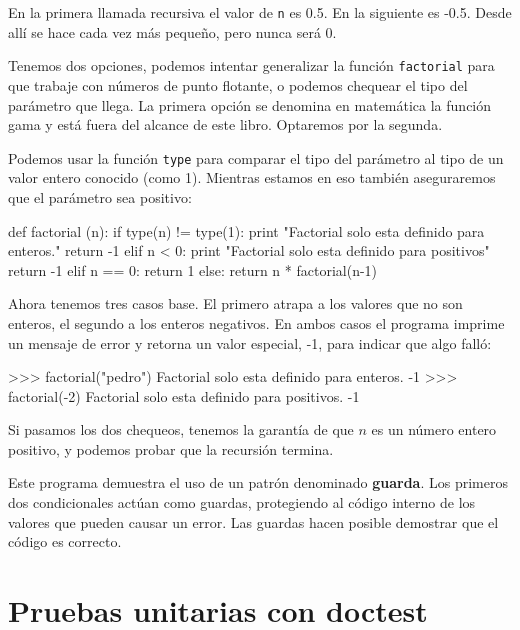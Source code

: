 
En la primera llamada recursiva el valor de  \texttt{n} es 0.5.
En la siguiente es -0.5.  Desde allí se hace cada vez más 
pequeño, pero nunca será 0.

Tenemos dos opciones, podemos intentar generalizar la función
 \texttt{factorial} para que trabaje con números de punto flotante, o
podemos chequear el tipo del parámetro que llega. La primera opción
se denomina en matemática la función gama y está fuera del 
alcance de este libro. Optaremos por la segunda.


Podemos usar la función  \texttt{type} para comparar el tipo
del parámetro al tipo de un valor entero conocido (como 1).  
Mientras estamos en eso también aseguraremos que el parámetro
sea positivo:

\beforeverb
\begin{pythoncode}
def factorial (n):
  if type(n) != type(1):
    print "Factorial solo esta definido para enteros."
    return -1
  elif n < 0:
    print "Factorial solo esta definido para positivos"
    return -1
  elif n == 0:
    return 1
  else:
    return n * factorial(n-1)
\end{pythoncode}
\afterverb
%

Ahora tenemos tres casos base. El primero atrapa a los valores
que no son enteros, el segundo a los enteros negativos.
En ambos casos el programa imprime un mensaje de error y retorna
un valor especial, -1, para indicar que algo falló:

\beforeverb
\begin{pyconcode}
>>> factorial("pedro")
Factorial solo esta definido para enteros.
-1
>>> factorial(-2)
Factorial solo esta definido para positivos.
-1
\end{pyconcode}
\afterverb
%

Si pasamos los dos chequeos, tenemos la garantía de que $n$ es 
un número entero  positivo, y podemos probar que la recursión termina.

Este programa demuestra el uso de un patrón denominado {\bf guarda}.
Los primeros dos condicionales actúan como guardas, protegiendo al 
código interno de los valores que pueden causar un error. Las 
guardas hacen posible demostrar que el código es correcto.

\section{Pruebas unitarias con doctest}

